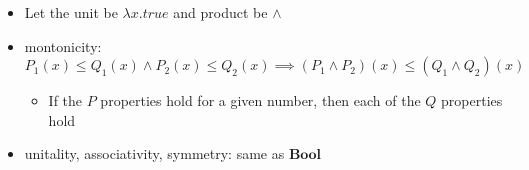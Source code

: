 \begin{itemize}
    \item Let the unit be $\lambda x. true$ and product be $\land$
    \item montonicity: $P_1(x)\leq Q_1(x) \land P_2(x) \leq Q_2(x) \implies (P_1 \land P_2)(x) \leq (Q_1 \land Q_2)(x)$
          \begin{itemize}
            \item If the $P$ properties hold for a given number, then each of the $Q$ properties hold
          \end{itemize}
    \item unitality, associativity, symmetry: same as $\mathbf{Bool}$
  \end{itemize}
